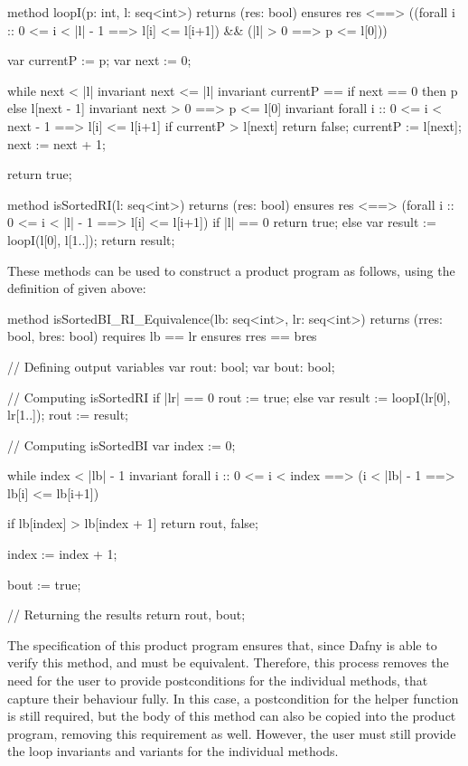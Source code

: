 \begin{dafny}
method loopI(p: int, l: seq<int>) returns (res: bool)
  ensures res <==> ((forall i :: 0 <= i < |l| - 1 ==> l[i] <= l[i+1]) && (|l| > 0 ==> p <= l[0]))
{
  var currentP := p;
  var next := 0;

  while next < |l|
    invariant next <= |l|
    invariant currentP == if next == 0 then p else l[next - 1]
    invariant next > 0 ==> p <= l[0]
    invariant forall i :: 0 <= i < next - 1 ==> l[i] <= l[i+1]
  {
    if currentP > l[next] {
        return false;
    }
    currentP := l[next];
    next := next + 1;
  }

  return true;
}

method isSortedRI(l: seq<int>) returns (res: bool)
  ensures res <==> (forall i :: 0 <= i < |l| - 1 ==> l[i] <= l[i+1])
{
  if |l| == 0 {
    return true;
  } else {
    var result := loopI(l[0], l[1..]);
    return result;
  }
}
\end{dafny}
%
These methods can be used to construct a product program as follows, using the definition of  given above:
\begin{dafny}
method isSortedBI_RI_Equivalence(lb: seq<int>, lr: seq<int>) returns (rres: bool, bres: bool)
  requires lb == lr
  ensures rres == bres
{
  // Defining output variables
  var rout: bool;
  var bout: bool;

  // Computing isSortedRI
  if |lr| == 0 {
    rout := true;
  } else {
    var result := loopI(lr[0], lr[1..]);
    rout := result;
  }

  // Computing isSortedBI
  var index := 0;

  while index < |lb| - 1
    invariant forall i :: 0 <= i < index ==> (i < |lb| - 1 ==> lb[i] <= lb[i+1])
  {
    if lb[index] > lb[index + 1] {
        return rout, false;
    }

    index := index + 1;
  }

  bout := true;

  // Returning the results
  return rout, bout;
}
\end{dafny}
%

The specification of this product program ensures that, since Dafny is able to verify this method,  and  must be equivalent. Therefore, this process removes the need for the user to provide postconditions for the individual methods, that capture their behaviour fully. In this case, a postcondition for the  helper function is still required, but the body of this method can also be copied into the product program, removing this requirement as well. However, the user must still provide the loop invariants and variants for the individual methods.

